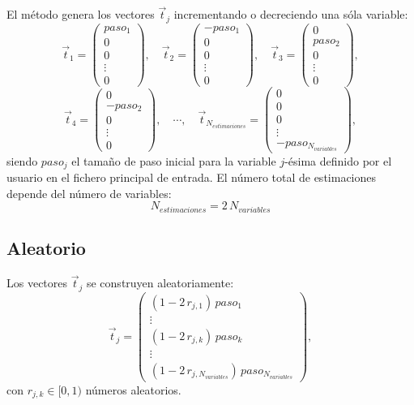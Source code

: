 \documentclass[a4paper]{report}
\newcommand{\EQ}[2]
{\begin{equation}#1\label{#2}\end{equation}}
\newcommand{\MATRIX}[2]{\PA{\begin{array}{#1}#2\end{array}}}
\newcommand{\PA}[1]{\left(#1\right)}
\begin{document}
El método genera los vectores $\vec{t}_j$ incrementando o decreciendo una sóla
variable:
\[
	\vec{t}_1=\MATRIX{c}{paso_1\\0\\0\\\vdots\\0},\quad
	\vec{t}_2=\MATRIX{c}{-paso_1\\0\\0\\\vdots\\0},\quad
	\vec{t}_3=\MATRIX{c}{0\\paso_2\\0\\\vdots\\0},
\]
\EQ
{
	\vec{t}_4=\MATRIX{c}{0\\-paso_2\\0\\\vdots\\0},\quad\cdots,\quad
	\vec{t}_{N_{estimaciones}}=\MATRIX{c}{0\\0\\0\\\vdots\\
	-paso_{N_{variables}}},
}{EqtDescent}
siendo $paso_j$ el tamaño de paso inicial para la variable $j$-ésima definido
por el usuario en el fichero principal de entrada. El número total de
estimaciones depende del número de variables:
\EQ{N_{estimaciones}=2\,N_{variables}}{EqNestimatesDescent}

\subsection{Aleatorio}

Los vectores $\vec{t}_j$ se construyen aleatoriamente:
\EQ
{
	\vec{t}_j=\MATRIX{c}{\PA{1-2\,r_{j,1}}\,paso_1\\\vdots\\
	\PA{1-2\,r_{j,k}}\,paso_k\\\vdots\\
	\PA{1-2\,r_{j,N_{variables}}}\,paso_{N_{variables}}},
}{EqtRandom}
con $r_{j,k}\in[0,1)$ números aleatorios.
\end{document}
